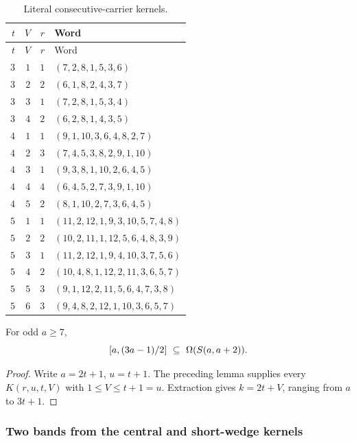 \begin{longtable}{@{}rrr@{\quad}l@{}}
\caption{Literal consecutive-carrier kernels.}
\label{ok:consecutive-table}\\
\toprule
$t$&$V$&$r$&Word\\ \midrule
\endfirsthead
\toprule $t$&$V$&$r$&Word\\ \midrule
\endhead
\bottomrule
\endfoot
$3$&$1$&$1$&$(7,2,8,1,5,3,6)$\\
$3$&$2$&$2$&$(6,1,8,2,4,3,7)$\\
$3$&$3$&$1$&$(7,2,8,1,5,3,4)$\\
$3$&$4$&$2$&$(6,2,8,1,4,3,5)$\\
$4$&$1$&$1$&$(9,1,10,3,6,4,8,2,7)$\\
$4$&$2$&$3$&$(7,4,5,3,8,2,9,1,10)$\\
$4$&$3$&$1$&$(9,3,8,1,10,2,6,4,5)$\\
$4$&$4$&$4$&$(6,4,5,2,7,3,9,1,10)$\\
$4$&$5$&$2$&$(8,1,10,2,7,3,6,4,5)$\\
$5$&$1$&$1$&$(11,2,12,1,9,3,10,5,7,4,8)$\\
$5$&$2$&$2$&$(10,2,11,1,12,5,6,4,8,3,9)$\\
$5$&$3$&$1$&$(11,2,12,1,9,4,10,3,7,5,6)$\\
$5$&$4$&$2$&$(10,4,8,1,12,2,11,3,6,5,7)$\\
$5$&$5$&$3$&$(9,1,12,2,11,5,6,4,7,3,8)$\\
$5$&$6$&$3$&$(9,4,8,2,12,1,10,3,6,5,7)$\\
\end{longtable}

\begin{proposition}\label{ok:consecutive-offsets}
For odd $a\ge7$,
\[
 [a,(3a-1)/2]\ \subseteq\ \Om(\Sp{a,a+2}).
 \]
\end{proposition}
\begin{proof}
Write $a=2t+1$, $u=t+1$. The preceding lemma supplies every
$K(r,u,t,V)$ with $1\le V\le t+1=u$.
Extraction gives $k=2t+V$, ranging from $a$ to $3t+1$.
\end{proof}

\subsubsection{Two bands from the central and short-wedge kernels}

